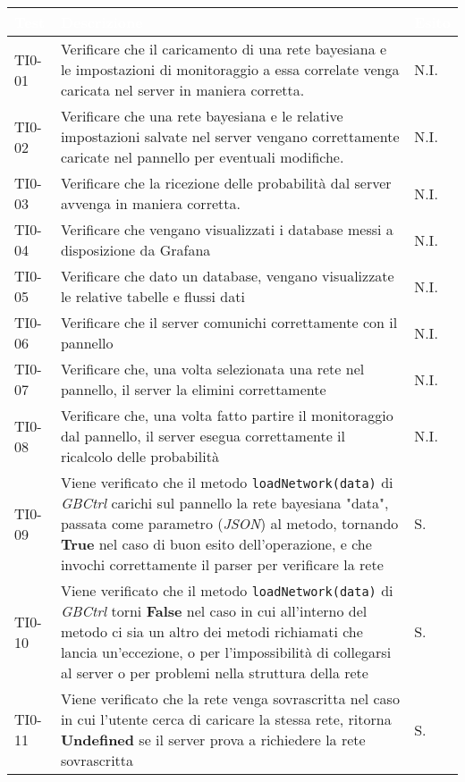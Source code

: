 \begin{longtable}{|C{.15\textwidth}|m{.66\textwidth}|m{.10\textwidth}|}
\hline
{}\textbf{\textcolor{white}{Test}} & \textbf{\textcolor{white}{Descrizione}} & \textbf{\textcolor{white}{Esito}}\\
\hline \hline
\endhead

TI0-01 & Verificare che il caricamento di una rete bayesiana e le impostazioni di monitoraggio a essa correlate venga caricata nel server in maniera corretta. & N.I. \\
\hline
{} TI0-02 & Verificare che una rete bayesiana e le relative impostazioni salvate nel server vengano correttamente caricate nel pannello per eventuali modifiche. & N.I. \\
\hline
TI0-03 & Verificare che la ricezione delle probabilità dal server avvenga in maniera corretta. & N.I. \\
\hline
{} TI0-04 & Verificare che vengano visualizzati i database messi a disposizione da Grafana & N.I. \\
\hline
TI0-05 & Verificare che dato un database, vengano visualizzate le relative tabelle e flussi dati & N.I. \\
\hline
{}TI0-06 & Verificare che il server comunichi correttamente con il pannello & N.I. \\
\hline
TI0-07 & Verificare che, una volta selezionata una rete nel pannello, il server la elimini correttamente & N.I. \\
\hline 
{}TI0-08 & Verificare che, una volta fatto partire il monitoraggio dal pannello, il server esegua correttamente il ricalcolo delle probabilità & N.I. \\  
\hline
TI0-09 & Viene verificato che il metodo \texttt{loadNetwork(data)} di \textit{GBCtrl} carichi sul pannello la rete bayesiana "data", passata come parametro (\textit{JSON}) al metodo, tornando \textbf{True} nel caso di buon esito dell'operazione, e che invochi correttamente il parser per verificare la rete & S.\\
\hline
{}TI0-10 & Viene verificato che il metodo \texttt{loadNetwork(data)} di \textit{GBCtrl} torni \textbf{False} nel caso in cui all'interno del metodo ci sia un altro dei metodi richiamati che lancia un'eccezione, o per l'impossibilità di collegarsi al server o per problemi nella struttura della rete  & S.\\
\hline
TI0-11 & Viene verificato che la rete venga sovrascritta nel caso in cui l'utente cerca di caricare la stessa rete, ritorna \textbf{Undefined} se il server prova a richiedere la rete sovrascritta & S. \\

\end{longtable}
